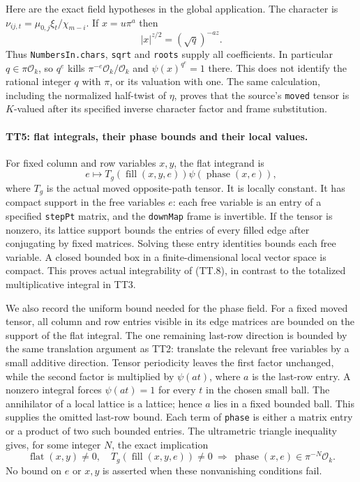 Here are the exact field hypotheses in the global application.
The character is
$\nu_{ij,t}=\mu_{0,j}\xi_t/\chi_{m-i}$. If $x=u\pi^a$ then
\[
 |x|^{z/2}=(\sqrt q)^{-az}.                                \tag{TT.7}
\]
Thus \texttt{NumbersIn.chars}, \texttt{sqrt} and \texttt{roots}
supply all coefficients. In particular $q\in\pi\mathcal O_k$,
so $q^e$ kills $\pi^{-e}\mathcal O_k/\mathcal O_k$ and
$\psi(x)^{q^e}=1$ there. This does not identify the rational
integer $q$ with $\pi$, or its valuation with one. The same
calculation, including the normalized half-twist of $\eta$, proves
that the source's \texttt{moved} tensor is $K$-valued after its
specified inverse character factor and frame substitution.

\paragraph{TT5: flat integrals, their phase bounds and their local values.}
For fixed column and row variables $x,y$, the flat integrand is
\[
 e\longmapsto T_g(\operatorname{fill}(x,y,e))
                       \psi(\operatorname{phase}(x,e)),     \tag{TT.8}
\]
where $T_g$ is the actual moved opposite-path tensor. It is locally
constant. It has compact support in the free variables $e$: each
free variable is an entry of a specified \texttt{stepPt} matrix,
and the \texttt{downMap} frame is invertible. If the tensor is
nonzero, its lattice support bounds the entries of every filled
edge after conjugating by fixed matrices. Solving these entry
identities bounds each free variable. A closed bounded box in a
finite-dimensional local vector space is compact. This proves
actual integrability of (TT.8), in contrast to the totalized
multiplicative integral in TT3.

We also record the uniform bound needed for the phase field. For a
fixed moved tensor, all column and row entries visible in its edge
matrices are bounded on the support of the flat integral. The one
remaining last-row direction is bounded by the same translation
argument as TT2: translate the relevant free variables by a small
additive direction. Tensor periodicity leaves the first factor
unchanged, while the second factor is multiplied by
$\psi(a t)$, where $a$ is the last-row entry. A nonzero integral
forces $\psi(a t)=1$ for every $t$ in the chosen small ball.
The annihilator of a local lattice is a lattice; hence $a$ lies in
a fixed bounded ball. This supplies the omitted last-row bound.
Each term of \texttt{phase} is either a matrix entry or a product
of two such bounded entries. The ultrametric triangle inequality
gives, for some integer $N$, the exact implication
\[
 \operatorname{flat}(x,y)\ne0,\quad
 T_g(\operatorname{fill}(x,y,e))\ne0
 \ \Longrightarrow\ \operatorname{phase}(x,e)
                          \in\pi^{-N}\mathcal O_k.          \tag{TT.9}
\]
No bound on $e$ or $x,y$ is asserted when these nonvanishing
conditions fail.

